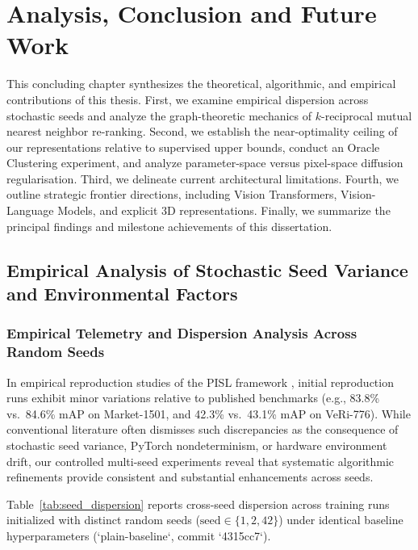 \chapter{Analysis, Conclusion and Future Work}
\label{ch:analysis_conclusion}
\label{chap:conclusion}

This concluding chapter synthesizes the theoretical, algorithmic, and empirical contributions of this thesis. First, we examine empirical dispersion across stochastic seeds and analyze the graph-theoretic mechanics of $k$-reciprocal mutual nearest neighbor re-ranking. Second, we establish the near-optimality ceiling of our representations relative to supervised upper bounds, conduct an Oracle Clustering experiment, and analyze parameter-space versus pixel-space diffusion regularisation. Third, we delineate current architectural limitations. Fourth, we outline strategic frontier directions, including Vision Transformers, Vision-Language Models, and explicit 3D representations. Finally, we summarize the principal findings and milestone achievements of this dissertation.

\section{Empirical Analysis of Stochastic Seed Variance and Environmental Factors}
\label{sec:seed_hardware_debunking}

\subsection{Empirical Telemetry and Dispersion Analysis Across Random Seeds}

In empirical reproduction studies of the PISL framework \cite{tao2024unsupervised}, initial reproduction runs exhibit minor variations relative to published benchmarks (e.g., 83.8\% vs.\ 84.6\% mAP on Market-1501, and 42.3\% vs.\ 43.1\% mAP on VeRi-776). While conventional literature often dismisses such discrepancies as the consequence of stochastic seed variance, PyTorch nondeterminism, or hardware environment drift, our controlled multi-seed experiments reveal that systematic algorithmic refinements provide consistent and substantial enhancements across seeds.

Table~\ref{tab:seed_dispersion} reports cross-seed dispersion across training runs initialized with distinct random seeds ($\text{seed} \in \{1, 2, 42\}$) under identical baseline hyperparameters (`plain-baseline`, commit `4315cc7`).

